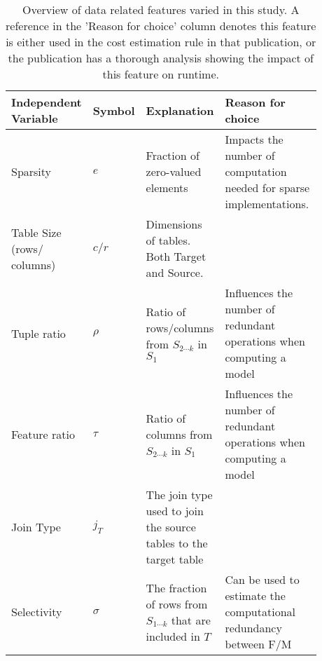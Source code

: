 \begingroup
\renewcommand{\arraystretch}{1.5}
\begin{table}[ht]
    \centering
    \begin{tabular}{p{0.16\linewidth}p{0.09\linewidth}p{0.23\linewidth}p{0.4\linewidth}}
        \toprule
        Independent Variable       & Symbol   & Explanation                                                        & Reason for choice                                                                                                                                          \\ \midrule \midrule
        Sparsity                   & $e$      & Fraction of zero-valued elements                                   & Impacts the number of computation needed for sparse implementations. \cite{MorpheusFIEnablingOptimizingNonlinear2019, morpheus, schijndel_cost_estimation} \\
        Table Size (rows/ columns) & $c/r$    & Dimensions of tables. Both Target and Source.                      & \cite{morpheus}                                                                                                                                            \\
        Tuple ratio                & $\rho$   & Ratio of rows/columns from $S_{2\cdots k}$ in $S_1$                & Influences the number of redundant operations when computing a model\cite{morpheus}                                                                        \\
        Feature ratio              & $\tau$   & Ratio of columns from $S_{2\cdots k}$ in $S_1$                     & Influences the number of redundant operations when computing a model\cite{morpheus}                                                                        \\
        Join Type                  & $j_T$    & The join type used to join the source tables to the target table   & \cite{schijndel_cost_estimation}                                                                                                                           \\
        Selectivity                & $\sigma$ & The fraction of rows from $S_{1\cdots k}$ that are included in $T$ & Can be used to estimate the computational redundancy between F/M \cite{MorpheusFIEnablingOptimizingNonlinear2019}                                          \\
        \bottomrule
    \end{tabular}
    \caption{Overview of data related features varied in this study. A reference in the 'Reason for choice' column denotes this feature is either used in the cost estimation rule in that publication, or the publication has a thorough analysis showing the impact of this feature on runtime.}
    \label{tab:4-data_chars}
\end{table}
\endgroup

